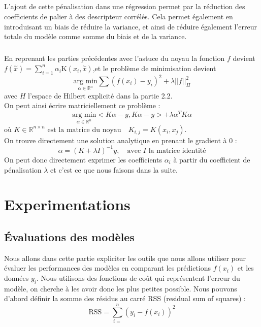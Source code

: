 \documentclass[a4paper,12pt,titlepage]{report}
\begin{document}
\paragraph{}
L'ajout de cette pénalisation dans une régression permet par la réduction des coefficients de palier à des descripteur corrélés. Cela permet également en introduisant un biais de réduire la variance, et ainsi de réduire également l'erreur totale du modèle comme somme du biais et de la variance.
\paragraph{}
En reprenant les parties précédentes avec l'astuce du noyau la fonction $f$ devient $f(\overset{\sim}{x}) = \sum_{i = 1}^{n}{\alpha_i \text{K}(x_i , \overset{\sim}{x})}$,et le problème de minimisation devient 
\[
\underset{\alpha \in \mathbb{R}^{n}}{\text{arg min}}\sum{(f(x_i) - y_i)^{2}} +  \lambda ||f||_H^{2}
\]
avec $H$ l'espace de Hilbert explicité dans la partie 2.2. \\
On peut ainsi écrire matriciellement ce problème :
\[
	\underset{\alpha \in \mathbb{R}^{n}}{\text{arg min}}<K \alpha - y , K 	\alpha -y > + \lambda \alpha^{T} K \alpha 
\]
$\text{où } K \in \mathbb{R}^{n \times n} \text{ est la matrice du 			noyau} \quad K_{i,j} = K(x_i, x_j)$. \\
On trouve directement une solution analytique en prenant le gradient à 0 :
\[
\alpha	=(K + \lambda I)^{-1}y, \quad \text{avec $I$ la matrice identité}
\]
On peut donc directement exprimer les coefficients $\alpha_i$ à partir du coefficient de pénalisation $\lambda$ et c'est ce que nous faisons dans la suite.


\chapter{Experimentations}
\section{Évaluations des modèles}
Nous allons dans cette partie expliciter les outils que nous allons utiliser pour évaluer les performances des modèles en comparant les prédictions $f(x_i)$ et les données $y_i$. Nous utilisons des fonctions de coût qui représentent l'erreur du modèle, on cherche à les avoir donc les plus petites possible. 
Nous pouvons d'abord définir la somme des résidus au carré RSS (residual sum of squares) : 
\[
\text{RSS} = \sum_{i=}^n {(y_i - f(x_i))^2}
\] 
\end{document}
